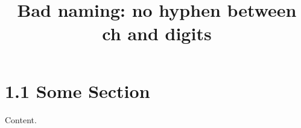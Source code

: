 \documentclass{article}
\title{Bad naming: no hyphen between ch and digits}
\begin{document}
\section{1.1 Some Section}
Content.
\end{document}
